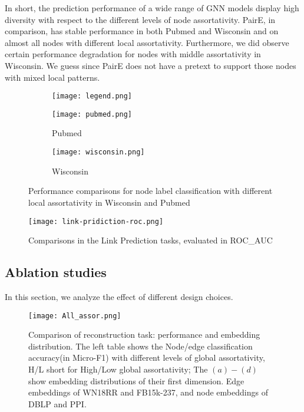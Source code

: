 \documentclass[10pt,journal,compsoc]{IEEEtran}
\begin{document}
In short, the prediction performance of a wide range of GNN models display high diversity with respect to the different levels of node assortativity. PairE, in comparison, has stable performance in both Pubmed and Wisconsin and on almost all nodes with different local assortativity. Furthermore, we did observe certain performance degradation for nodes with middle assortativity in Wisconsin. We guess since PairE does not have a pretext to support those nodes with mixed local patterns. 


\begin{figure}[htb]
\centering

\begin{subfigure}{0.8\columnwidth}
\centering
\texttt{[image: legend.png]}
\end{subfigure}


\begin{subfigure}{0.495\columnwidth}
\centering
\texttt{[image: pubmed.png]}
\caption{Pubmed}
\end{subfigure}
\begin{subfigure}{0.495\columnwidth}
\centering
\texttt{[image: wisconsin.png]}

 \caption{Wisconsin}
\end{subfigure}
\caption{Performance comparisons for node label classification with different local assortativity in Wisconsin and Pubmed}
\label{fig:local_assor}
\end{figure}


\begin{figure}[tb]
\centering
\texttt{[image: link-pridiction-roc.png]}
\vspace{-0.3cm} 
\centering
\caption{Comparisons in the Link Prediction tasks, evaluated in ROC\_AUC }
\vspace{-0.3cm}
\label{fig:link}
\end{figure}


\subsection{Ablation studies}
  In this section, we analyze the effect of different design choices.
    
\begin{figure*}[ht]
\centering

\texttt{[image: All\_assor.png]}
\caption{Comparison of reconstruction task: performance and embedding distribution. The left table shows the Node/edge classification accuracy(in Micro-F1) with different levels of global assortativity, H/L short for High/Low global assortativity; The $(a)-(d)$ show embedding distributions of their first dimension. Edge embeddings of WN18RR and FB15k-237, and node embeddings of DBLP and PPI.}
\label{fig:assor}
\end{figure*}
\end{document}
